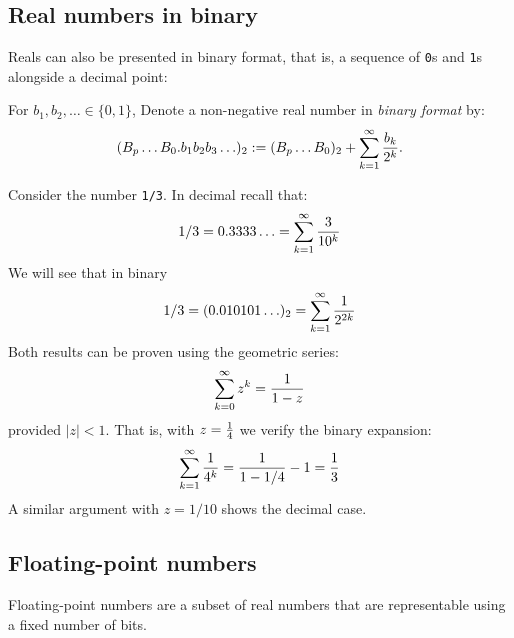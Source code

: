 \subsection{Real numbers in binary}
Reals can also be presented in binary format, that is, a sequence of \texttt{0}s and \texttt{1}s alongside a decimal point:

\begin{definition} For $b_1,b_2,\ensuremath{\ldots}\in \{0,1\}$, Denote a non-negative real number in \emph{binary format} by:
\[
(B_p \ensuremath{\ldots}B_0.b_1b_2b_3\ensuremath{\ldots})_2 := (B_p \ensuremath{\ldots}B_0)_2 +  \sum_{k=1}^\ensuremath{\infty} {b_k \over 2^k}.
\]
\end{definition}

\begin{example} Consider the number \texttt{1/3}.  In decimal recall that:
\[
1/3 = 0.3333\ensuremath{\ldots}=  \sum_{k=1}^\ensuremath{\infty} {3 \over 10^k}
\]
We will see that in binary
\[
1/3 = (0.010101\ensuremath{\ldots})_2 = \sum_{k=1}^\ensuremath{\infty} {1 \over 2^{2k}}
\]
Both results can be proven using the geometric series:
\[
\sum_{k=0}^\ensuremath{\infty} z^k = {1 \over 1 - z}
\]
provided $|z| < 1$. That is, with $z = {1 \over 4}$ we verify the binary expansion:
\[
\sum_{k=1}^\ensuremath{\infty} {1 \over 4^k} = {1 \over 1 - 1/4} - 1 = {1 \over 3}
\]
A similar argument with $z = 1/10$ shows the decimal case. \end{example}

\subsection{Floating-point numbers}
Floating-point numbers are a subset of real numbers that are representable using a fixed number of bits.

